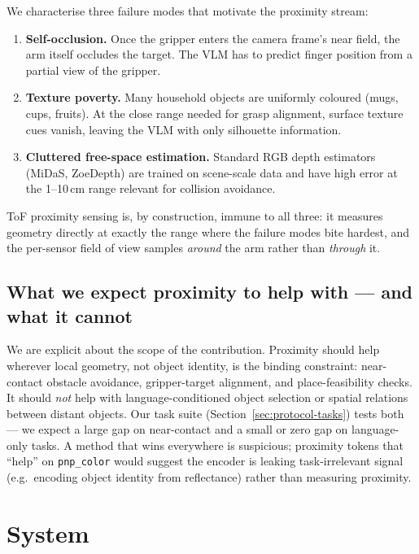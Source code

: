 \documentclass[11pt]{article}
\begin{document}
We characterise three failure modes that motivate the proximity stream:

\begin{enumerate}[leftmargin=1.5em,topsep=0.2em,itemsep=0.2em]
\item \textbf{Self-occlusion.} Once the gripper enters the camera frame's
  near field, the arm itself occludes the target. The VLM has to predict
  finger position from a partial view of the gripper.
\item \textbf{Texture poverty.} Many household objects are uniformly
  coloured (mugs, cups, fruits). At the close range needed for grasp
  alignment, surface texture cues vanish, leaving the VLM with only
  silhouette information.
\item \textbf{Cluttered free-space estimation.} Standard RGB depth
  estimators (MiDaS, ZoeDepth) are trained on scene-scale data and have
  high error at the 1--10\,cm range relevant for collision avoidance.
\end{enumerate}

ToF proximity sensing is, by construction, immune to all three: it
measures geometry directly at exactly the range where the failure modes
bite hardest, and the per-sensor field of view samples \emph{around} the
arm rather than \emph{through} it.

\subsection{What we expect proximity to help with --- and what it cannot}

We are explicit about the scope of the contribution. Proximity should
help wherever local geometry, not object identity, is the binding
constraint: near-contact obstacle avoidance, gripper-target alignment,
and place-feasibility checks. It should \emph{not} help with
language-conditioned object selection or spatial relations between
distant objects. Our task suite (Section~\ref{sec:protocol-tasks}) tests
both --- we expect a large gap on near-contact and a small or zero gap
on language-only tasks. A method that wins everywhere is suspicious;
proximity tokens that ``help'' on \texttt{pnp\_color} would suggest the
encoder is leaking task-irrelevant signal (e.g.\ encoding object
identity from reflectance) rather than measuring proximity.

\section{System}
\label{sec:system}
\end{document}
